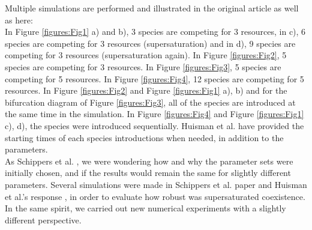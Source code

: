 Multiple simulations are performed and illustrated in the original article as well as here: \\
In Figure \ref{figures:Fig1} a) and b), 3 species are competing for 3 resources, in c), 6 species are competing for 3 resources (supersaturation) and in d), 9 species are competing for 3 resources (supersaturation again). In Figure \ref{figures:Fig2}, 5 species are competing for 3 resources. In Figure \ref{figures:Fig3}, 5 species are competing for 5 resources. In Figure \ref{figures:Fig4}, 12 species are competing for 5 resources. In Figure \ref{figures:Fig2} and Figure \ref{figures:Fig1} a), b) and for the bifurcation diagram of Figure \ref{figures:Fig3}, all of the species are introduced at the same time in the simulation. In Figure \ref{figures:Fig4} and Figure \ref{figures:Fig1} c), d), the species were introduced sequentially. Huisman et al. \cite{1999:Huisman} have provided the starting times of each species introductions when needed, in addition to the parameters.\\


As Schippers et al. \cite{2001:Schippers}, we were wondering how and why the parameter sets were initially chosen, and if the results would remain the same for slightly different parameters. Several simulations were made in Schippers et al. paper \cite{2001:Schippers} and Huisman et al.'s response \cite{2001:Huisman}, in order to evaluate how robust was supersaturated coexistence. In the same spirit, we carried out new numerical experiments with a slightly different perspective.\\

